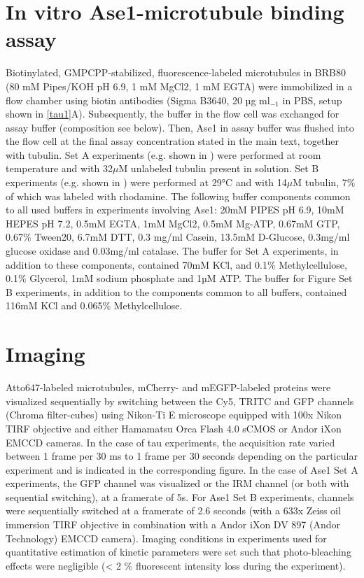 \section{In vitro Ase1-microtubule binding assay}
Biotinylated, GMPCPP-stabilized, fluorescence-labeled microtubules in BRB80 (80 mM Pipes/KOH pH 6.9, 1 mM MgCl2, 1 mM EGTA) were immobilized in a flow chamber using biotin antibodies (Sigma B3640, 20 µg ml$_{-1}$ in PBS, setup shown in \autoref{tau1}A). Subsequently, the buffer in the flow cell was exchanged for assay buffer (composition see below). Then, Ase1 in assay buffer was flushed into the flow cell at the final assay concentration stated in the main text, together with tubulin. Set A experiments (e.g. shown in ) were performed at room temperature and with 32$\mu$M unlabeled tubulin present in solution. Set B experiments (e.g. shown in ) were performed at 29°C and with 14$\mu$M tubulin, 7\% of which was labeled with rhodamine. The following buffer components common to all used buffers in experiments involving Ase1: 20mM PIPES pH 6.9, 10mM HEPES pH 7.2, 0.5mM EGTA, 1mM MgCl2, 0.5mM Mg-ATP, 0.67mM GTP, 0.67\% Tween20, 6.7mM DTT, 0.3 mg/ml Casein, 13.5mM D-Glucose, 0.3mg/ml glucose oxidase and 0.03mg/ml catalase. The buffer for Set A experiments, in addition to these components, contained 70mM KCl, and 0.1\% Methylcellulose, 0.1\% Glycerol, 1mM sodium phosphate and 1µM ATP. The buffer for Figure Set B experiments, in addition to the components common to all buffers, contained 116mM KCl and 0.065\% Methylcellulose.

\section{Imaging}
Atto647-labeled microtubules, mCherry- and mEGFP-labeled proteins were visualized sequentially by switching between the Cy5, TRITC and GFP channels (Chroma filter-cubes) using Nikon-Ti E microscope equipped with 100x Nikon TIRF objective and either Hamamatsu Orca Flash 4.0 sCMOS or Andor iXon EMCCD cameras. In the case of tau experiments, the acquisition rate varied between 1 frame per 30 ms to 1 frame per 30 seconds depending on the particular experiment and is indicated in the corresponding figure. In the case of Ase1 Set A experiments, the GFP channel was visualized or the IRM channel (or both with sequential switching), at a framerate of 5s. For Ase1 Set B experiments, channels were sequentially switched at a framerate of 2.6 seconds (with a 633x Zeiss oil immersion TIRF objective in combination with a Andor iXon DV 897 (Andor Technology) EMCCD camera). Imaging conditions in experiments used for quantitative estimation of kinetic parameters were set such that photo-bleaching effects were negligible (< 2 \% fluorescent intensity loss during the experiment). 

